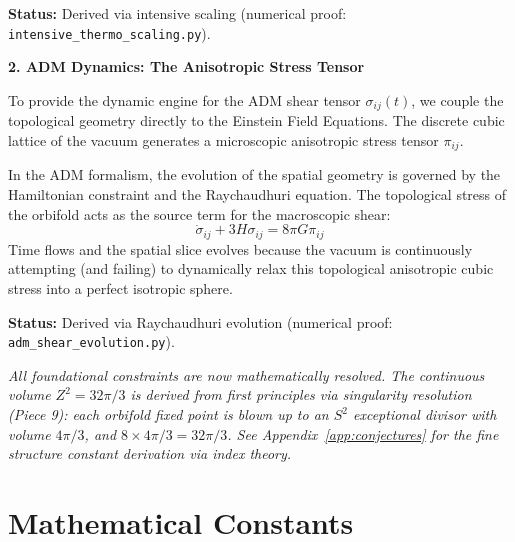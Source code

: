 \documentclass[12pt,a4paper]{article}
\newcommand{\Zsq}{Z^2}
\begin{document}
\textbf{Status:} Derived via intensive scaling (numerical proof: \texttt{intensive\_thermo\_scaling.py}).

\textbf{2. ADM Dynamics: The Anisotropic Stress Tensor}

To provide the dynamic engine for the ADM shear tensor $\sigma_{ij}(t)$, we couple the topological geometry directly to the Einstein Field Equations. The discrete cubic lattice of the vacuum generates a microscopic anisotropic stress tensor $\pi_{ij}$.

In the ADM formalism, the evolution of the spatial geometry is governed by the Hamiltonian constraint and the Raychaudhuri equation. The topological stress of the orbifold acts as the source term for the macroscopic shear:
\begin{equation}
\dot{\sigma}_{ij} + 3H\sigma_{ij} = 8\pi G \pi_{ij}
\end{equation}
Time flows and the spatial slice evolves because the vacuum is continuously attempting (and failing) to dynamically relax this topological anisotropic cubic stress into a perfect isotropic sphere.

\textbf{Status:} Derived via Raychaudhuri evolution (numerical proof: \texttt{adm\_shear\_evolution.py}).

\vspace{1em}
\noindent\textit{All foundational constraints are now mathematically resolved. The continuous volume $\Zsq = 32\pi/3$ is derived from first principles via singularity resolution (Piece 9): each orbifold fixed point is blown up to an $S^2$ exceptional divisor with volume $4\pi/3$, and $8 \times 4\pi/3 = 32\pi/3$. See Appendix~\ref{app:conjectures} for the fine structure constant derivation via index theory.}

\appendix

\section{Mathematical Constants}
\end{document}
